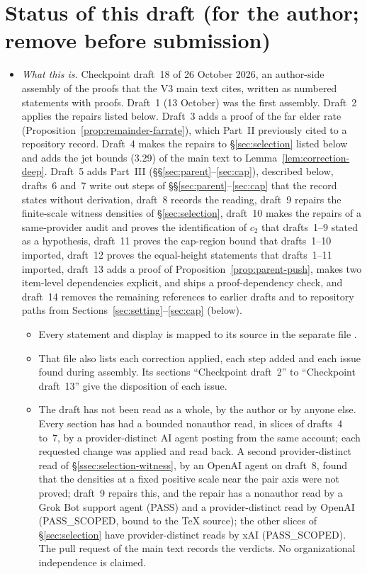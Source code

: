 \section*{Status of this draft (for the author; remove before submission)}

\begin{itemize}[leftmargin=1.5em,itemsep=2pt]
\item \emph{What this is.} Checkpoint draft~18 of 26 October 2026, an author-side assembly of the proofs that the V3 main text cites, written as numbered statements with proofs. Draft~1 (13 October) was the first assembly. Draft~2 applies the repairs listed below. Draft~3 adds a proof of the far elder rate (Proposition~\ref{prop:remainder-farrate}), which Part~II previously cited to a repository record. Draft~4 makes the repairs to \S\ref{sec:selection} listed below and adds the jet bounds (3.29) of the main text to Lemma~\ref{lem:correction-deep}. Draft~5 adds Part~III (\S\S\ref{sec:parent}--\ref{sec:cap}), described below, drafts~6 and~7 write out steps of \S\S\ref{sec:parent}--\ref{sec:cap} that the record states without derivation, draft~8 records the reading, draft~9 repairs the finite-scale witness densities of \S\ref{sec:selection}, draft~10 makes the repairs of a same-provider audit and proves the identification of $c_2$ that drafts~1--9 stated as a hypothesis, draft~11 proves the cap-region bound that drafts~1--10 imported, draft~12 proves the equal-height statements that drafts~1--11 imported, draft~13 adds a proof of Proposition~\ref{prop:parent-push}, makes two item-level dependencies explicit, and ships a proof-dependency check, and draft~14 removes the remaining references to earlier drafts and to repository paths from Sections~\ref{sec:setting}--\ref{sec:cap} (below).
  \begin{itemize}[leftmargin=1.2em,itemsep=1pt]
  \item Every statement and display is mapped to its source in the separate file .
  \item That file also lists each correction applied, each step added and each issue found during assembly. Its sections ``Checkpoint draft~2'' to ``Checkpoint draft~13'' give the disposition of each issue.
  \item The draft has not been read as a whole, by the author or by anyone else. Every section has had a bounded nonauthor read, in slices of drafts~4 to~7, by a provider-distinct AI agent posting from the same account; each requested change was applied and read back. A second provider-distinct read of \S\ref{ssec:selection-witness}, by an OpenAI agent on draft~8, found that the densities at a fixed positive scale near the pair axis were not proved; draft~9 repairs this, and the repair has a nonauthor read by a Grok Bot support agent (PASS) and a provider-distinct read by OpenAI (PASS\_SCOPED, bound to the \TeX{} source); the other slices of \S\ref{sec:selection} have provider-distinct reads by xAI (PASS\_SCOPED). The pull request of the main text records the verdicts. No organizational independence is claimed.

\end{itemize}
\end{itemize}

